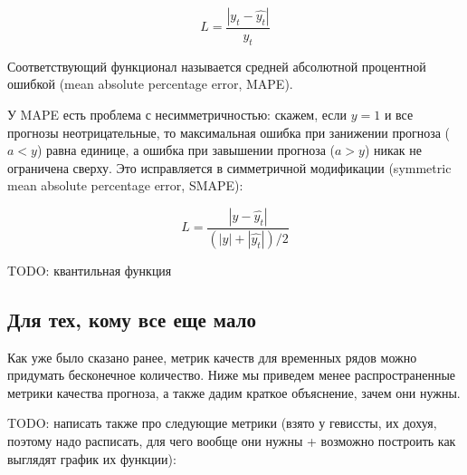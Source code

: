 \[
  L = \frac{|y_t - \hat{y_t}|}{y_t}
\]

Соответствующий функционал называется средней абсолютной процентной
ошибкой (mean absolute percentage error, MAPE).

У MAPE есть проблема с несимметричностью: скажем, если $y = 1$ и все
прогнозы неотрицательные, то максимальная ошибка при занижении
прогноза ($a < y$) равна единице, а ошибка при завышении прогноза ($a
> y$) никак не ограничена сверху. Это исправляется в симметричной
модификации (symmetric mean absolute percentage error, SMAPE):

\[
  L = \frac{|y - \hat{y_t}|}{(|y| + |\hat{y_t}|)/2}
\]

TODO: квантильная функция

\subsection{Для тех, кому все еще мало}

Как уже было сказано ранее, метрик качеств для временных рядов можно
придумать бесконечное количество. Ниже мы приведем менее
распространенные метрики качества прогноза, а также дадим краткое
объяснение, зачем они нужны.

TODO: написать также про следующие метрики (взято у гевиссты, их
  дохуя, поэтому надо расписать, для чего вообще они нужны + возможно
построить как выглядят график их функции):


